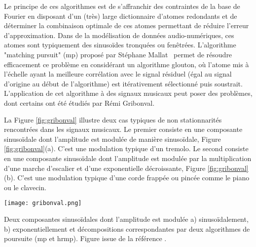Le principe de ces algorithmes est de s'affranchir des contraintes de la base de Fourier en disposant d'un (très) large dictionnaire d'atomes redondants et de déterminer la combinaison optimale de ces atomes permettant de réduire l'erreur d'approximation. Dans de la modélisation de données audio-numériques, ces atomes sont typiquement des sinusoïdes tronquées ou fenêtrées. L'algorithme "matching pursuit" (mp) proposé par Stéphane Mallat~\cite{mallat1993matching} permet de résoudre efficacement ce problème en considérant un algorithme glouton, où l'atome mis à l'échelle ayant la meilleure corrélation avec le signal résiduel (égal au signal d'origine au début de l'algorithme) est itérativement sélectionné puis soustrait. L'application de cet algorithme à des signaux musicaux peut poser des problèmes, dont certains ont été étudiés par Rémi Gribonval.~\cite{gribonval1996sound} %

La Figure \ref{fig:gribonval} illustre deux cas typiques de non stationnarités rencontrées dans les signaux musicaux. Le premier consiste en une composante sinusoïdale dont l'amplitude est modulée de manière sinusoïdale, Figure \ref{fig:gribonval}(a). C'est une modulation typique d'un tremolo. Le second consiste en une composante sinusoïdale dont l'amplitude est modulée par la multiplication d'une marche d'escalier et d'une exponentielle décroissante, Figure \ref{fig:gribonval}(b). C'est une modulation typique d'une corde frappée ou pincée comme le piano ou le clavecin.


\begin{marginfigure}
  \texttt{[image: gribonval.png]}
  \caption{Deux composantes sinusoïdales dont l'amplitude est modulée a) sinusoïdalement, b) exponentiellement et décompositions correspondantes par deux algorithmes de poursuite (mp et hrmp). Figure issue de la référence .}
  \label{fig:gribonval}
\end{marginfigure}

